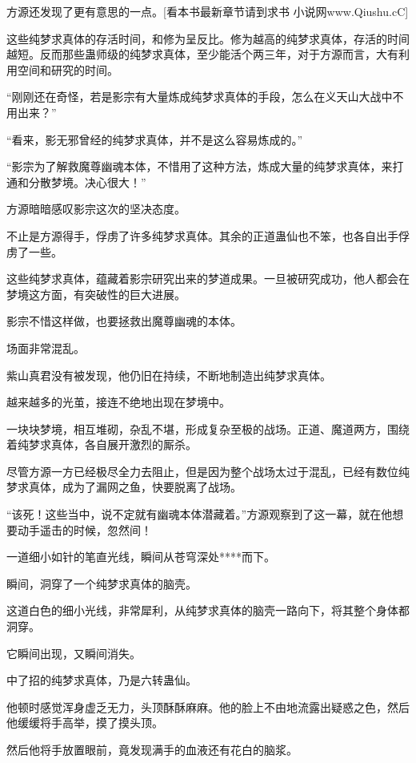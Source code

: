 
\begin{this_body}

方源还发现了更有意思的一点。[看本书最新章节请到求书 小说网www.Qiushu.cC]

这些纯梦求真体的存活时间，和修为呈反比。修为越高的纯梦求真体，存活的时间越短。反而那些蛊师级的纯梦求真体，至少能活个两三年，对于方源而言，大有利用空间和研究的时间。

“刚刚还在奇怪，若是影宗有大量炼成纯梦求真体的手段，怎么在义天山大战中不用出来？”

“看来，影无邪曾经的纯梦求真体，并不是这么容易炼成的。”

“影宗为了解救魔尊幽魂本体，不惜用了这种方法，炼成大量的纯梦求真体，来打通和分散梦境。决心很大！”

方源暗暗感叹影宗这次的坚决态度。

不止是方源得手，俘虏了许多纯梦求真体。其余的正道蛊仙也不笨，也各自出手俘虏了一些。

这些纯梦求真体，蕴藏着影宗研究出来的梦道成果。一旦被研究成功，他人都会在梦境这方面，有突破性的巨大进展。

影宗不惜这样做，也要拯救出魔尊幽魂的本体。

场面非常混乱。

紫山真君没有被发现，他仍旧在持续，不断地制造出纯梦求真体。

越来越多的光茧，接连不绝地出现在梦境中。

一块块梦境，相互堆砌，杂乱不堪，形成复杂至极的战场。正道、魔道两方，围绕着纯梦求真体，各自展开激烈的厮杀。

尽管方源一方已经极尽全力去阻止，但是因为整个战场太过于混乱，已经有数位纯梦求真体，成为了漏网之鱼，快要脱离了战场。

“该死！这些当中，说不定就有幽魂本体潜藏着。”方源观察到了这一幕，就在他想要动手遥击的时候，忽然间！

一道细小如针的笔直光线，瞬间从苍穹深处****而下。

瞬间，洞穿了一个纯梦求真体的脑壳。

这道白色的细小光线，非常犀利，从纯梦求真体的脑壳一路向下，将其整个身体都洞穿。

它瞬间出现，又瞬间消失。

中了招的纯梦求真体，乃是六转蛊仙。

他顿时感觉浑身虚乏无力，头顶酥酥麻麻。他的脸上不由地流露出疑惑之色，然后他缓缓将手高举，摸了摸头顶。

然后他将手放置眼前，竟发现满手的血液还有花白的脑浆。


\end{this_body}
